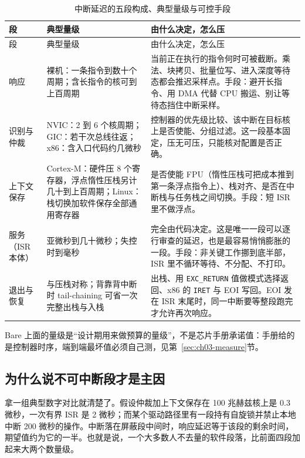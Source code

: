 \documentclass[12pt,a4paper,fontset=fandol]{ctexbook}
\newcommand{\Tp}[1]{\texttt{#1}}
\newcommand{\Lang}[1]{\textsf{#1}}
\newcommand{\DomBare}{\Lang{Bare}}
\begin{document}
\begin{longtable}{>{\raggedright\arraybackslash}p{} >{\raggedright\arraybackslash}p{} >{\raggedright\arraybackslash}p{}}
\caption{中断延迟的五段构成、典型量级与可控手段}\label{tab:ch03-latency-breakdown}\\
\toprule
段 & 典型量级 & 由什么决定，怎么压 \\
\midrule
\endfirsthead
\toprule
段 & 典型量级 & 由什么决定，怎么压 \\
\midrule
\endhead
\bottomrule
\endfoot
\endlastfoot
响应 & 裸机：一条指令到数十个周期；含长指令的核可到上百周期 & 当前正在执行的指令何时可被截断。乘法、块拷贝、批量位写、进入深度等待态都会推迟采样点。手段：避开长指令、用 DMA 代替 CPU 搬运、别让等待态挡住中断采样。 \\
\addlinespace
识别与仲裁 & NVIC：2 到 6 个核周期；GIC：若干次总线往返；x86：含入口代码约几微秒 & 控制器的优先级比较、该中断在目标核上是否使能、分组过滤。这一段基本固定，压无可压，只能核对配置是否正确。 \\
\addlinespace
上下文保存 & Cortex-M：硬件压 8 个寄存器，浮点惰性压栈另计几十到上百周期；Linux：栈切换加软件保存全部通用寄存器 & 是否使能 FPU（惰性压栈可把成本推到第一条浮点指令上）、栈对齐、是否在中断栈与任务栈之间切换。手段：短 ISR 里不做浮点。 \\
\addlinespace
服务（ISR 本体） & 亚微秒到几十微秒；失控时到毫秒 & 完全由代码决定。这是唯一一段可以逐行审查的延迟，也是最容易悄悄膨胀的一段。手段：非关键工作挪到底半部，ISR 里不循环等待、不分配、不打印。 \\
\addlinespace
退出与恢复 & 与压栈对称；背靠背中断时 tail-chaining 可省一次完整出栈与入栈 & 出栈、用 \Tp{EXC\_RETURN} 值做模式选择返回、x86 的 \Tp{IRET} 与 EOI 写回。EOI 发在 ISR 末尾时，同一中断要等整段跑完才允许再次响应。 \\
\end{longtable}

\DomBare{} 上面的量级是``设计期用来做预算的量级''，不是芯片手册承诺值：手册给的是控制器时序，端到端最坏值必须自己测，见第~\ref{sec:ch03-measure}节。

\subsection{为什么说不可中断段才是主因}

拿一组典型数字对比就清楚了。假设仲裁加上下文保存在 100 兆赫兹核上是 0.3 微秒，一次有界 ISR 是 2 微秒；而某个驱动路径里有一段持有自旋锁并禁止本地中断 200 微秒的操作。中断落在屏蔽段中间时，响应延迟等于该段的剩余时间，期望值约为它的一半。也就是说，一个大多数人不去量的软件段落，比前面四段加起来大两个数量级。
\end{document}
